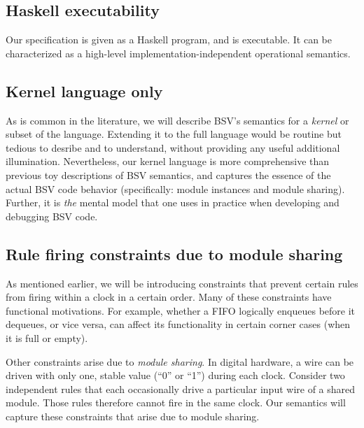 \documentclass[11pt]{article}
\begin{document}

\subsection{Haskell executability}

Our specification is given as a Haskell program, and is executable.
It can be characterized as a high-level implementation-independent
operational semantics.


\subsection{Kernel language only}

As is common in the literature, we will describe BSV's semantics for a
\emph{kernel} or subset of the language.  Extending it to the full
language would be routine but tedious to desribe and to understand,
without providing any useful additional illumination.  Nevertheless,
our kernel language is more comprehensive than previous toy
descriptions of BSV semantics, and captures the essence of the actual
BSV code behavior (specifically: module instances and module sharing).
Further, it is \emph{the} mental model that one uses in practice when
developing and debugging BSV code.


\subsection{Rule firing constraints due to module sharing}

As mentioned earlier, we will be introducing constraints that prevent
certain rules from firing within a clock in a certain order.  Many of
these constraints have functional motivations.  For example, whether a
FIFO logically enqueues before it dequeues, or vice versa, can affect
its functionality in certain corner cases (when it is full or empty).

Other constraints arise due to \emph{module sharing}.  In digital
hardware, a wire can be driven with only one, stable value (``0'' or
``1'') during each clock.  Consider two independent rules that each
occasionally drive a particular input wire of a shared module.  Those
rules therefore cannot fire in the same clock.  Our semantics will
capture these constraints that arise due to module sharing.
\end{document}
